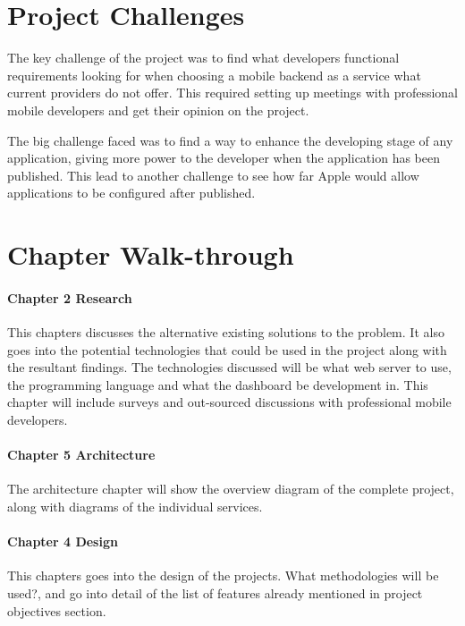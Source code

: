 \section{Project Challenges}

The key challenge of the project was to find what developers functional requirements looking for when choosing a mobile backend as a service what current providers do not offer. This required setting up meetings with professional mobile developers and get their opinion on the project.

The big challenge faced was to find a way to enhance the developing stage of any application, giving more power to the developer when the application has been published. This lead to another challenge to see how far Apple would allow applications to be configured after published.

\section{Chapter Walk-through}

\paragraph{Chapter 2 Research}

This chapters discusses the alternative existing solutions to the problem. It also goes into the potential technologies that could be used in the project along with the resultant findings. The technologies discussed will be what web server to use, the programming language and what the dashboard be development in. This chapter will include surveys and out-sourced discussions with professional mobile developers.

\paragraph{Chapter 5 Architecture}

The architecture chapter will show the overview diagram of the complete project, along with diagrams of the individual services.


\paragraph{Chapter 4 Design}

This chapters goes into the design of the projects. What methodologies will be used?, and go into detail of the list of features already mentioned in project objectives section.

